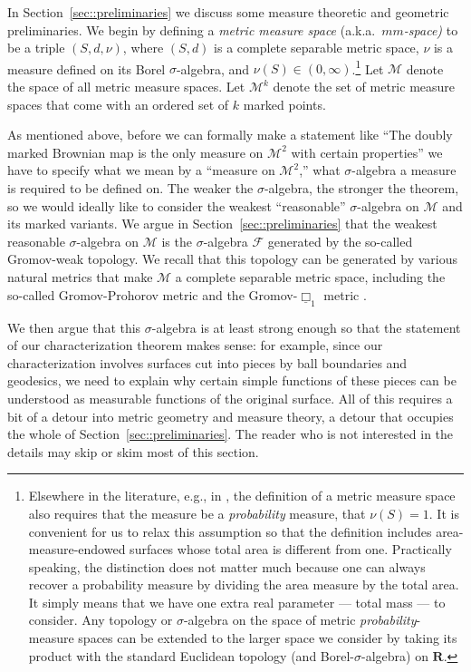 \documentclass[JEP,XML,SOM,Unicode]{cedram}
\let\mathcal\mathscr
\theoremstyle{plain}
\numberwithin{theorem}{section}
\theoremstyle{definition}
\newcommand\mmspace{{\mathcal M}}
\newcommand\mmsigma{{\mathcal F}}
\newcommand{\R}{\mathbf{R}}
\begin{document}
In Section~\ref{sec::preliminaries} we discuss some measure theoretic and geometric preliminaries. We begin by defining a \emph{metric measure space} (a.k.a.\ \emph{$mm$-space)} to be a triple $(S, d, \nu)$, where $(S,d)$ is a complete separable metric space, $\nu$ is a measure defined on its Borel $\sigma$-algebra, and $\nu(S) \in (0, \infty)$.\footnote{Elsewhere in the literature, e.g., in \cite{grevenpfaffelhuberwinter}, the definition of a metric measure space also requires that the measure be a \emph{probability} measure, \ie that $\nu(S) = 1$. It is convenient for us to relax this assumption so that the definition includes area-measure-endowed surfaces whose total area is different from one. Practically speaking, the distinction does not matter much because one can always recover a probability measure by dividing the area measure by the total area. It simply means that we have one extra real parameter --- total mass --- to consider. Any topology or $\sigma$-algebra on the space of metric \emph{probability}-measure spaces can be extended to the larger space we consider by taking its product with the standard Euclidean topology (and Borel-$\sigma$-algebra) on $\R$.} Let $\mmspace$ denote the space of all metric measure spaces. Let $\mmspace^k$ denote the set of metric measure spaces that come with an ordered set of $k$ marked points.

As mentioned above, before we can formally make a statement like ``The doubly marked Brownian map is the only measure on $\mmspace^2$ with certain properties'' we have to specify what we mean by a ``measure on $\mmspace^2$,'' \ie what $\sigma$-algebra a measure is required to be defined on. The weaker the $\sigma$-algebra, the stronger the theorem, so we would ideally like to consider the weakest ``reasonable'' $\sigma$-algebra on $\mmspace$ and its marked variants. We argue in Section~\ref{sec::preliminaries} that the weakest reasonable $\sigma$-algebra on $\mmspace$ is the $\sigma$-algebra $\mmsigma$ generated by the so-called Gromov-weak topology. We recall that this topology can be generated by various natural metrics that make $\mmspace$ a complete separable metric space, including the so-called Gromov-Prohorov metric and the Gromov-$\underline \Box_1$ metric \cite{grevenpfaffelhuberwinter, gromovprohorovandgromovbox}.

We then argue that this $\sigma$-algebra is at least strong enough so that the statement of our characterization theorem makes sense: for example, since our characterization involves surfaces cut into pieces by ball boundaries and geodesics, we need to explain why certain simple functions of these pieces can be understood as measurable functions of the original surface. All of this requires a bit of a detour into metric geometry and measure theory, a detour that occupies the whole of Section~\ref{sec::preliminaries}. The reader who is not interested in the details may skip or skim most of this section.\enlargethispage{.1\baselineskip}%
\end{document}
